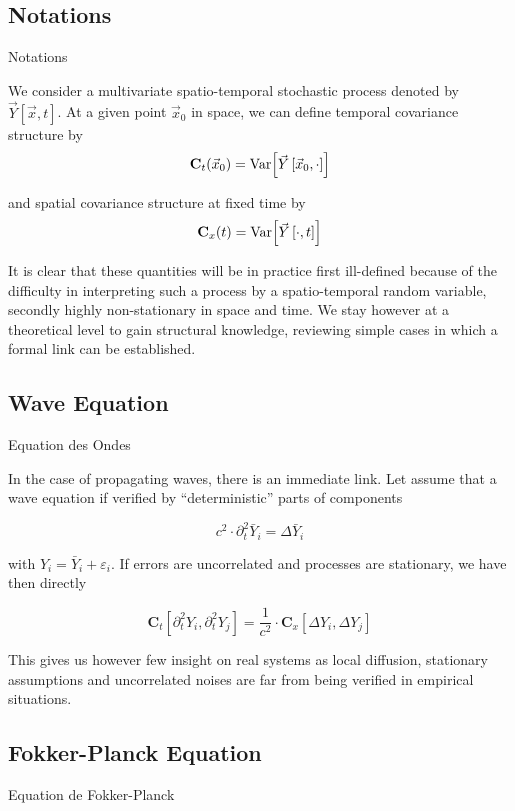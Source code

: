 \subsection{Notations}{Notations}

We consider a multivariate spatio-temporal stochastic process denoted by $\vec{Y}\left[\vec{x},t\right]$. At a given point $\vec{x}_0$ in space, we can define temporal covariance structure by
\[
\mathbf{C}_t (\vec{x}_0) = \operatorname{Var}\!\left[\vec{Y}\left[\vec{x}_0, \cdot\right]\right]
\]

and spatial covariance structure at fixed time by
\[
\mathbf{C}_x (t) = \operatorname{Var}\!\left[\vec{Y}\left[\cdot, t\right]\right]
\]

It is clear that these quantities will be in practice first ill-defined because of the difficulty in interpreting such a process by a spatio-temporal random variable, secondly highly non-stationary in space and time. We stay however at a theoretical level to gain structural knowledge, reviewing simple cases in which a formal link can be established.


\subsection{Wave Equation}{Equation des Ondes}

In the case of propagating waves, there is an immediate link. Let assume that a wave equation if verified by ``deterministic'' parts of components

\begin{equation}
c^2 \cdot \partial^2_{t} \bar{Y}_i = \Delta \bar{Y}_i
\end{equation}

with $Y_i = \bar{Y}_i + \varepsilon_i$. If errors are uncorrelated and processes are stationary, we have then directly

\begin{equation}
\mathbf{C}_t \left[ \partial^2_t Y_i , \partial^2_t Y_j \right] = \frac{1}{c^2} \cdot\mathbf{C}_x \left[ \Delta Y_i , \Delta Y_j \right]
\end{equation}

This gives us however few insight on real systems as local diffusion, stationary assumptions and uncorrelated noises are far from being verified in empirical situations.

\subsection{Fokker-Planck Equation}{Equation de Fokker-Planck}

